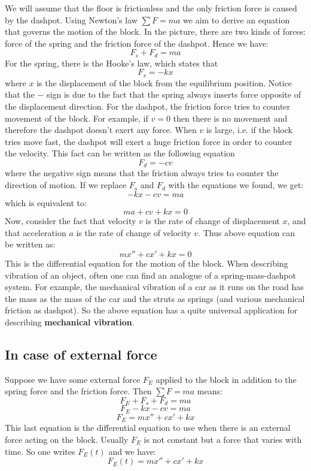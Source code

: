\documentclass[12pt]{report}
\begin{document}
We will assume that the floor is frictionless and the only friction force is caused by the dashpot. Using Newton's law $\sum F = ma$ we aim to derive an equation that governs the motion of the block.
In the picture, there are two kinds of forces: force of the spring and the friction force of the dashpot. Hence we have:
$$F_s + F_d = ma$$
For the spring, there is the Hooke's law, which states that
$$F_s = - kx$$
where $x$ is the displacement of the block from the equilibrium position. Notice that the $-$ sign is due to the fact that the spring always inserts force opposite of the displacement direction.
For the dashpot, the friction force tries to counter movement of the block. For example, if $v=0$ then there is no movement and therefore the dashpot doesn't exert any force. When $v$ is large, i.e. if the block tries move fast, the dashpot will exert a huge friction force in order to counter the velocity. This fact can be written as the following equation
$$F_d = -c v$$
where the negative sign means that the friction always tries to counter the direction of motion.
If we replace $F_s$ and $F_d$ with the equations we found, we get:
$$-kx -cv = ma$$
which is equivalent to:
$$ma +cv + kx =0$$
Now, consider the fact that velocity $v$ is the rate of change of displacement $x$, and that acceleration $a$ is the rate of change of velocity $v$. Thus above equation can be written as:
$$m x'' +c x' + kx=0$$
This is the differential equation for the motion of the block. When describing vibration of an object, often one can find an analogue of a spring-mass-dashpot system. For example, the mechanical vibration of a car as it runs on the road has the mass as the mass of the car and the struts as springs (and various mechanical friction as dashpot). So the above equation has a quite universal application for describing \textbf{mechanical vibration}.

\subsection*{In case of external force}
Suppose we have some external force $F_E$ applied to the block in addition to the spring force and the friction force. Then $\sum F = ma$ means:
$$F_E +F_s + F_d =ma$$
$$F_E - kx -cv =ma$$
$$F_E = mx'' + cx'+kx$$
This last equation is the differential equation to use when there is an external force acting on the block. Usually $F_E$ is not constant but a force that varies with time. So one writes $F_E (t)$ and we have:
$$F_E (t) = mx'' + cx'+kx$$
\end{document}
